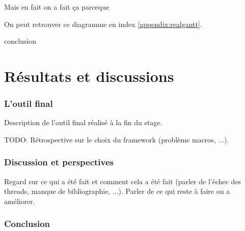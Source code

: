 \documentclass[a4paper]{article}
\begin{document}

Mais en fait on a fait ça parceque

On peut retrouver ce diagramme en index \ref{appendix:realgantt}.


conclusion

\clearpage
\part{Résultats et discussions}

\section{L'outil final}

Description de l'outil final réalisé à la fin du stage.

TODO: Rétrospective sur le choix du framework (problème macros, ...).

\clearpage

\section{Discussion et perspectives}

Regard sur ce qui a été fait et comment cela a été fait (parler de l'échec
des threads, manque de bibliographie, ...). Parler de ce qui reste à faire ou a
améliorer.

\clearpage

\section*{Conclusion}
\end{document}
